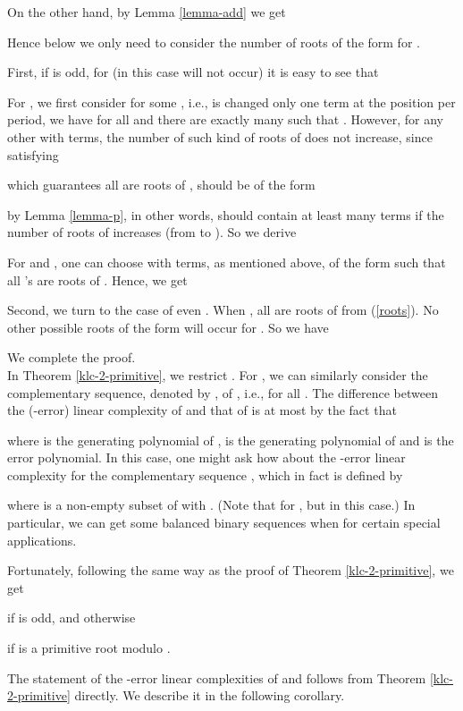 \documentclass [11pt,a4paper]{article}
\begin{document}
 On the other hand, by Lemma \ref{lemma-add} we get

Hence below we only need to consider the number of roots of the form  for .

First, if  is odd, for  (in this case  will not occur) it is easy to see that

For , we first consider  for some , i.e.,  is changed only one term at the position  per period, we have  for all  and there are exactly  many  such that . However, for any other  with  terms, the number of such kind of roots of  does not increase, since   satisfying

which guarantees all  are roots of , should be of the form

by Lemma \ref{lemma-p}, in other words,  should contain at least  many terms if the number of roots of   increases (from  to ). So we derive

For  and , one can choose  with  terms, as mentioned above,  of the form  such that all 's   are roots of .  Hence, we get



Second, we turn to the case of even . When , all   are roots of   from (\ref{roots}). No other possible roots of the form  will occur for .
So we have

We complete the proof.   ~\hfill \\

In Theorem \ref{klc-2-primitive}, we restrict . For , we can similarly consider the complementary sequence, denoted by , of , i.e.,  for all . The difference between the (-error) linear complexity of  and that of   is at most  by the fact that

where  is the generating polynomial of ,  is the generating polynomial of  and  is the error polynomial. In this case, one might ask how about the -error linear complexity for the complementary sequence , which in fact is defined by

where  is a non-empty subset of  with .
(Note that  for , but  in this case.)  In particular, we can get some balanced binary sequences when  for certain special applications.


Fortunately, following the same way as the proof of Theorem \ref{klc-2-primitive}, we get

if  is odd, and otherwise

if  is a primitive root modulo .


The statement of the -error linear complexities of  and  follows from Theorem \ref{klc-2-primitive} directly.
We describe it in the following corollary.
\end{document}
